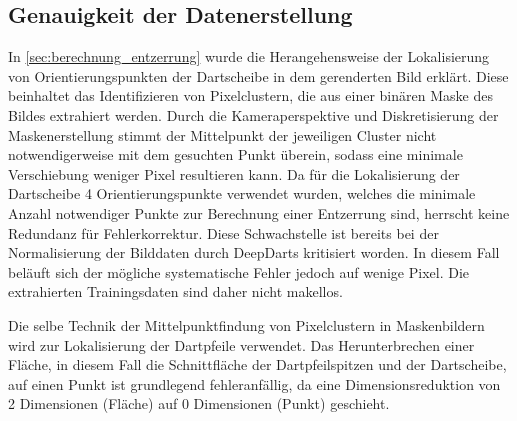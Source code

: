 
\subsection{Genauigkeit der Datenerstellung}

In \autoref{sec:berechnung_entzerrung} wurde die Herangehensweise der Lokalisierung von Orientierungspunkten der Dartscheibe in dem gerenderten Bild erklärt. Diese beinhaltet das Identifizieren von Pixelclustern, die aus einer binären Maske des Bildes extrahiert werden. Durch die Kameraperspektive und Diskretisierung der Maskenerstellung stimmt der Mittelpunkt der jeweiligen Cluster nicht notwendigerweise mit dem gesuchten Punkt überein, sodass eine minimale Verschiebung weniger Pixel resultieren kann. Da für die Lokalisierung der Dartscheibe 4 Orientierungspunkte verwendet wurden, welches die minimale Anzahl notwendiger Punkte zur Berechnung einer Entzerrung sind, herrscht keine Redundanz für Fehlerkorrektur. Diese Schwachstelle ist bereits bei der Normalisierung der Bilddaten durch DeepDarts kritisiert worden. In diesem Fall beläuft sich der mögliche systematische Fehler jedoch auf wenige Pixel. Die extrahierten Trainingsdaten sind daher nicht makellos.

Die selbe Technik der Mittelpunktfindung von Pixelclustern in Maskenbildern wird zur Lokalisierung der Dartpfeile verwendet. Das Herunterbrechen einer Fläche, in diesem Fall die Schnittfläche der Dartpfeilspitzen und der Dartscheibe, auf einen Punkt ist grundlegend fehleranfällig, da eine Dimensionsreduktion von 2 Dimensionen (Fläche) auf 0 Dimensionen (Punkt) geschieht.


